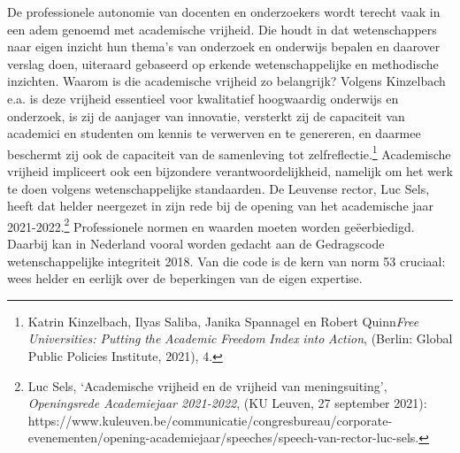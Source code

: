 \documentclass[smallauthor, chapterhaspagenum, nochapterinheader, pagenuminheader,  bigchapnum,medium2, tocpages,  garamond, titleinheader]{jote-book}
\begin{document}
	De professionele autonomie van docenten en onderzoekers wordt terecht vaak in een adem genoemd met academische vrijheid. Die houdt in dat wetenschappers naar eigen inzicht hun thema's van onderzoek en onderwijs bepalen en daarover verslag doen, uiteraard gebaseerd op erkende wetenschappelijke en methodische inzichten. Waarom is die academische vrijheid zo belangrijk? Volgens Kinzelbach e.a. is deze vrijheid essentieel voor kwalitatief hoogwaardig onderwijs en onderzoek, is zij de aanjager van innovatie, versterkt zij de capaciteit van academici en studenten om kennis te verwerven en te genereren, en daarmee beschermt zij ook de capaciteit van de samenleving tot zelfreflectie.\footnote{Katrin Kinzelbach, Ilyas Saliba, Janika Spannagel en Robert Quinn\emph{Free}\emph{ }\emph{Universities}\emph{: Putting }\emph{the}\emph{ }\emph{Academic}\emph{ }\emph{Freedom}\emph{ Index }\emph{into}\emph{ Action}, (Berlin: Global Public Policies Institute, 2021), 4.} Academische vrijheid impliceert ook een bijzondere verantwoordelijkheid, namelijk om het werk te doen volgens wetenschappelijke standaarden. De Leuvense rector, Luc Sels, heeft dat helder neergezet in zijn rede bij de opening van het academische jaar 2021-2022.\footnote{Luc Sels, ‘Academische vrijheid en de vrijheid van meningsuiting', \emph{Openingsrede Academiejaar 2021-2022}, (KU Leuven, 27 september 2021): https://www.kuleuven.be/communicatie/congresbureau/corporate-evenementen/opening-academiejaar/speeches/speech-van-rector-luc-sels.} Professionele normen en waarden moeten worden geëerbiedigd. Daarbij kan in Nederland vooral worden gedacht aan de Gedragscode wetenschappelijke integriteit 2018. Van die code is de kern van norm 53 cruciaal: wees helder en eerlijk over de beperkingen van de eigen expertise.
\end{document}
